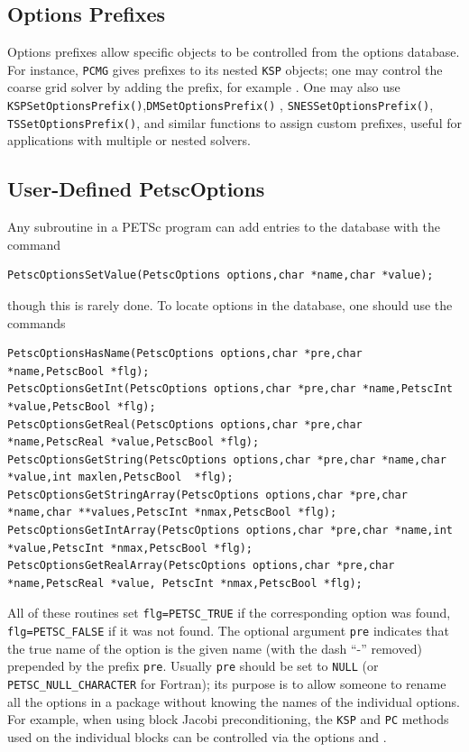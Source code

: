{{{\subsection{Options Prefixes}
Options prefixes allow specific objects to be controlled from the options database.
For instance, \lstinline{PCMG} gives prefixes to its nested \lstinline{KSP} objects;
one may control the coarse grid solver by adding the  prefix, for example 
.
One may also use \break \lstinline{KSPSetOptionsPrefix()},\lstinline{DMSetOptionsPrefix()}
, \lstinline{SNESSetOptionsPrefix()}, \lstinline{TSSetOptionsPrefix()}, and similar 
functions to assign custom prefixes, useful for applications with multiple or nested 
solvers.

\subsection{User-Defined PetscOptions}

Any subroutine in a PETSc program can add entries to the database with the
command
\begin{lstlisting}
PetscOptionsSetValue(PetscOptions options,char *name,char *value);
\end{lstlisting}
though this is rarely done.
To locate options in the database, one should use the
commands
\begin{lstlisting}
PetscOptionsHasName(PetscOptions options,char *pre,char *name,PetscBool *flg);
PetscOptionsGetInt(PetscOptions options,char *pre,char *name,PetscInt *value,PetscBool *flg);
PetscOptionsGetReal(PetscOptions options,char *pre,char *name,PetscReal *value,PetscBool *flg);
PetscOptionsGetString(PetscOptions options,char *pre,char *name,char *value,int maxlen,PetscBool  *flg);
PetscOptionsGetStringArray(PetscOptions options,char *pre,char *name,char **values,PetscInt *nmax,PetscBool *flg);
PetscOptionsGetIntArray(PetscOptions options,char *pre,char *name,int *value,PetscInt *nmax,PetscBool *flg);
PetscOptionsGetRealArray(PetscOptions options,char *pre,char *name,PetscReal *value, PetscInt *nmax,PetscBool *flg);
\end{lstlisting}
All of
these
routines set \lstinline{flg=PETSC_TRUE} if the corresponding option was found, \lstinline{flg=PETSC_FALSE} if it
was not found.  The optional argument
\lstinline{pre} indicates that the true name of the option is the given name
(with the dash ``-'' removed) prepended by the prefix \lstinline{pre}.
Usually \lstinline{pre} should be set to \lstinline{NULL} (or \lstinline{PETSC_NULL_CHARACTER}
for Fortran); its purpose is to
allow someone to rename all the options in a package without knowing
the names of the individual options.  For example, when using block
Jacobi preconditioning, the \lstinline{KSP} and \lstinline{PC} methods used on the individual
blocks can be controlled via the options  and . 

}}}
